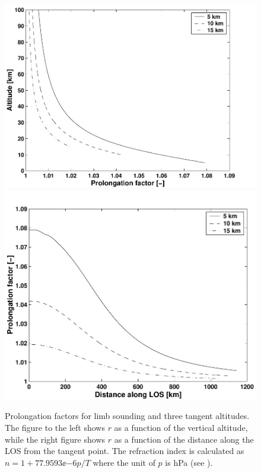   \begin{figure}
   \begin{center}
    \includegraphics*[width=0.49\hsize]{Figs/fig_pfac_z}
    \includegraphics*[width=0.46\hsize]{Figs/fig_pfac_l}
     \caption{Prolongation factors for limb sounding and three tangent
              altitudes. The figure to the left shows $r$ as a function
              of the vertical altitude, while the right figure shows $r$ as 
              a function of the distance along the LOS from the tangent point.
              The refraction index is calculated as $n=1+77.9593\ee{-6}p/T$
              where the unit of $p$ is hPa (see \citet{elgered:93}).}
    \label{fig:los:pfac}
   \end{center} 
  \end{figure}



